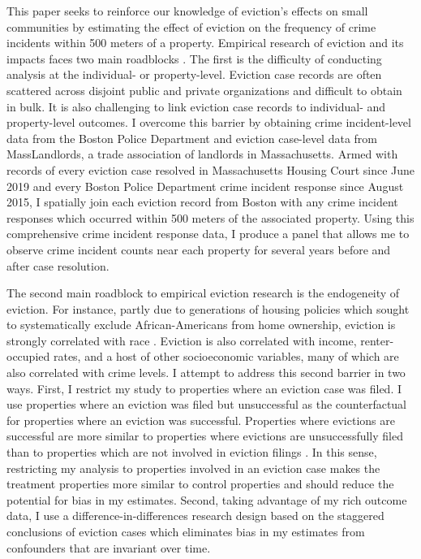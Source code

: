 \documentclass[12pt]{article}
\begin{document}
This paper seeks to reinforce our knowledge of eviction's effects on small communities by estimating the effect of eviction on the frequency of crime incidents within 500 meters of a property. Empirical research of eviction and its impacts faces two main roadblocks \citep{collinson_eviction_2022}. The first is the difficulty of conducting analysis at the individual- or property-level. Eviction case records are often scattered across disjoint public and private organizations and difficult to obtain in bulk. It is also challenging to link eviction case records to individual- and property-level outcomes. I overcome this barrier by obtaining crime incident-level data from the Boston Police Department and eviction case-level data from MassLandlords, a trade association of landlords in Massachusetts. Armed with records of every eviction case resolved in Massachusetts Housing Court since June 2019 and every Boston Police Department crime incident response since August 2015, I spatially join each eviction record from Boston with any crime incident responses which occurred within 500 meters of the associated property. Using this comprehensive crime incident response data, I produce a panel that allows me to observe crime incident counts near each property for several years before and after case resolution. 


The second main roadblock to empirical eviction research is the endogeneity of eviction. For instance, partly due to generations of housing policies which sought to systematically exclude African-Americans from home ownership, eviction is strongly correlated with race \citep{rothstein_color_2017}. Eviction is also correlated with income, renter-occupied rates, and a host of other socioeconomic variables, many of which are also correlated with crime levels. I attempt to address this second barrier in two ways. First, I restrict my study to properties where an eviction case was filed. I use properties where an eviction was filed but unsuccessful as the counterfactual for properties where an eviction was successful. Properties where evictions are successful are more similar to properties where evictions are unsuccessfully filed than to properties which are not involved in eviction filings \citep{robinson_eviction_2021}. In this sense, restricting my analysis to properties involved in an eviction case makes the treatment properties more similar to control properties and should reduce the potential for bias in my estimates. Second, taking advantage of my rich outcome data, I use a difference-in-differences research design based on the staggered conclusions of eviction cases which eliminates bias in my estimates from confounders that are invariant over time. 
\end{document}
